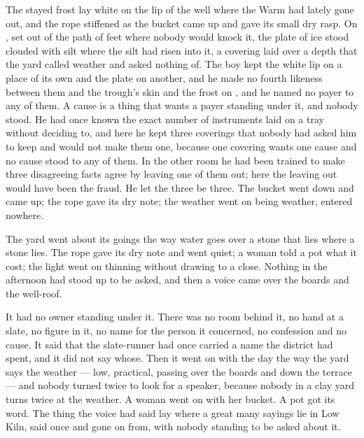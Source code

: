 The stayed frost lay white on the lip of the well where the Warm had lately gone out, and the rope stiffened as the bucket came up and gave its small dry rasp. On , set out of the path of feet where nobody would knock it, the plate of ice stood clouded with silt where the silt had risen into it, a covering laid over a depth that the yard called weather and asked nothing of. The boy kept the white lip on a place of its own and the plate on another, and he made no fourth likeness between them and the trough's skin and the frost on , and he named no payer to any of them. A cause is a thing that wants a payer standing under it, and nobody stood. He had once known the exact number of instruments laid on a tray without deciding to, and here he kept three coverings that nobody had asked him to keep and would not make them one, because one covering wants one cause and no cause stood to any of them. In the other room he had been trained to make three disagreeing facts agree by leaving one of them out; here the leaving out would have been the fraud. He let the three be three. The bucket went down and came up; the rope gave its dry note; the weather went on being weather, entered nowhere.

\scenebreak

The yard went about its goings the way water goes over a stone that lies where a stone lies. The rope gave its dry note and went quiet; a woman told a pot what it cost; the light went on thinning without drawing to a close. Nothing in the afternoon had stood up to be asked, and then a voice came over the boards and the well-roof.

It had no owner standing under it. There was no room behind it, no hand at a slate, no figure in it, no name for the person it concerned, no confession and no cause. It said that the slate-runner had once carried a name the district had spent, and it did not say whose. Then it went on with the day the way the yard says the weather --- low, practical, passing over the boards and down the terrace --- and nobody turned twice to look for a speaker, because nobody in a clay yard turns twice at the weather. A woman went on with her bucket. A pot got its word. The thing the voice had said lay where a great many sayings lie in Low Kiln, said once and gone on from, with nobody standing to be asked about it.

